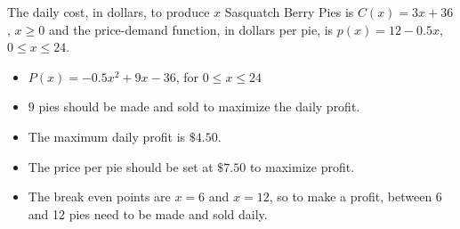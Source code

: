 {The daily cost, in dollars, to produce $x$ Sasquatch Berry Pies is $C(x) = 3x + 36$, $x \geq 0$ and the price-demand function, in  dollars per pie,  is $p(x) = 12-0.5x$, $0 \leq x \leq 24$.}
{\begin{itemize}

\item $P(x) = -0.5 x^2+9x-36$, for $0 \leq x \leq 24$

\item  $9$ pies should be made and sold to maximize the daily profit.

\item The maximum daily profit is $\$4.50$.

\item  The price per pie should be set at $\$7.50$ to maximize profit.

\item  The break even points are $x=6$ and $x=12$, so to make a profit, between 6 and 12 pies  need to be made and sold daily.

\end{itemize}
}